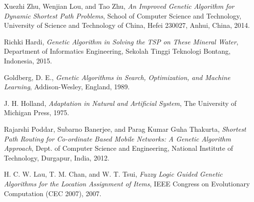 \documentclass[journal]{IEEEtran}
\begin{document}
\begin{thebibliography}{5}

Xuezhi Zhu, Wenjian Lou, and Tao Zhu,
\textit{An Improved Genetic Algorithm for Dynamic Shortest Path Problems},
School of Computer Science and Technology, University of Science and Technology of China, Hefei 230027, Anhui, China, 2014.

Richki Hardi,
\textit{Genetic Algorithm in Solving the TSP on These Mineral Water},
Department of Informatics Engineering, Sekolah Tinggi Teknologi Bontang, Indonesia, 2015.

Goldberg, D. E.,
\textit{Genetic Algorithms in Search, Optimization, and Machine Learning},
Addison-Wesley, England, 1989.

J. H. Holland,
\textit{Adaptation in Natural and Artificial System},
The University of Michigan Press, 1975.

Rajarshi Poddar, Subarno Banerjee, and Parag Kumar Guha Thakurta,
\textit{Shortest Path Routing for Co-ordinate Based Mobile Networks: A Genetic Algorithm Approach},
Dept. of Computer Science and Engineering, National Institute of Technology, Durgapur, India, 2012.

H. C. W. Lau, T. M. Chan, and W. T. Tsui,
\textit{Fuzzy Logic Guided Genetic Algorithms for the Location Assignment of Items},
IEEE Congress on Evolutionary Computation (CEC 2007), 2007.

\end{thebibliography}
\end{document}
